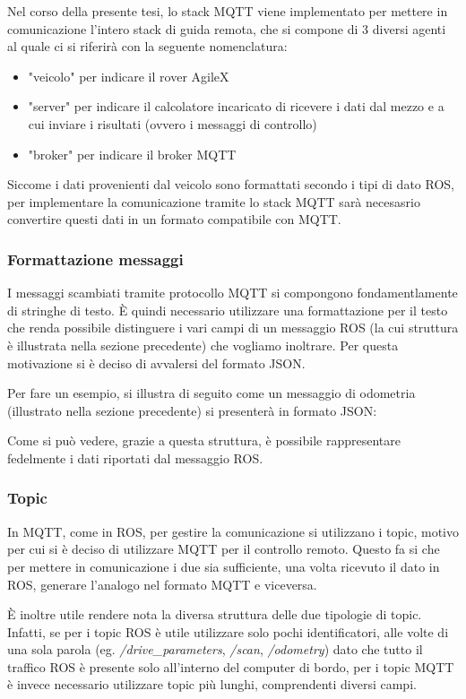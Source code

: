 \noindent Nel corso della presente tesi, lo stack MQTT viene implementato per mettere in comunicazione l'intero stack di guida remota, che si compone di 3 diversi agenti al quale ci si riferirà con la seguente nomenclatura:
\begin{itemize}
    \item "veicolo" per indicare il rover AgileX
    \item "server" per indicare il calcolatore incaricato di ricevere i dati dal mezzo e a cui inviare i risultati (ovvero i messaggi di controllo)
    \item "broker" per indicare il broker MQTT
\end{itemize}
Siccome i dati provenienti dal veicolo sono formattati secondo i tipi di dato ROS, per implementare la comunicazione tramite lo stack MQTT sarà necesasrio convertire questi dati in un formato compatibile con MQTT.

\subsubsection{Formattazione messaggi}
I messaggi scambiati tramite protocollo MQTT si compongono fondamentlamente di stringhe di testo. È quindi necessario utilizzare una formattazione per il testo che renda possibile distinguere i vari campi di un messaggio ROS (la cui struttura è illustrata nella sezione precedente) che vogliamo inoltrare. Per questa motivazione si è deciso di avvalersi del formato JSON.

\noindent Per fare un esempio, si illustra di seguito come un messaggio di odometria (illustrato nella sezione precedente) si presenterà in formato JSON:



\noindent Come si può vedere, grazie a questa struttura, è possibile rappresentare fedelmente i dati riportati dal messaggio ROS.

\subsubsection{Topic} \label{mqtt_topic}
In MQTT, come in ROS, per gestire la comunicazione si utilizzano i topic, motivo per cui si è deciso di utilizzare MQTT per il controllo remoto. Questo fa si che per mettere in comunicazione i due sia sufficiente, una volta ricevuto il dato in ROS, generare l'analogo nel formato MQTT e viceversa.     

\noindent È inoltre utile rendere nota la diversa struttura delle due tipologie di topic. Infatti, se per i topic ROS è utile utilizzare solo pochi identificatori, alle volte di una sola parola (eg. \textit{/drive\_parameters}, \textit{/scan}, \textit{/odometry}) dato che tutto il traffico ROS è presente solo all'interno del computer di bordo, per i topic MQTT è invece necessario utilizzare topic più lunghi, comprendenti diversi campi.

